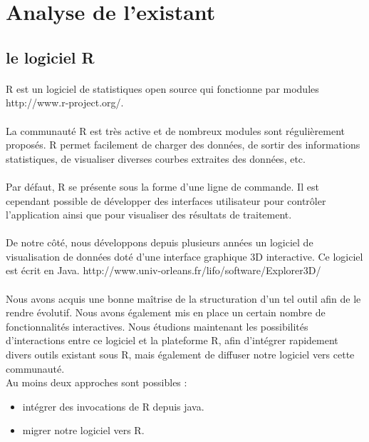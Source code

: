 \section{Analyse de l'existant}
\subsection{le logiciel R}
\paragraph{}
R est un logiciel de statistiques open source qui fonctionne par modules
http://www.r-project.org/.
\paragraph{}
La communauté R est très active et de nombreux modules sont régulièrement proposés.
R permet facilement de charger des données, de sortir des informations statistiques, de visualiser
diverses courbes extraites des données, etc.
\paragraph{}
Par défaut, R se présente sous la forme d'une ligne de commande. Il est cependant possible de
développer des interfaces utilisateur pour contrôler l'application ainsi que pour visualiser des
résultats de traitement.
\paragraph{}
De notre côté, nous développons depuis plusieurs années un logiciel de visualisation de données
doté d'une interface graphique 3D interactive. Ce logiciel est écrit en Java.
http://www.univ-orleans.fr/lifo/software/Explorer3D/
\paragraph{}
Nous avons acquis une bonne maîtrise de la structuration d'un tel outil afin de le rendre évolutif.
Nous avons également mis en place un certain nombre de fonctionnalités interactives.
Nous étudions maintenant les possibilités d'interactions entre ce logiciel et la plateforme R, afin d'intégrer rapidement divers outils existant sous R, mais également de diffuser notre logiciel vers cette communauté.\\Au moins deux approches sont possibles :
\begin{itemize}

\item intégrer des invocations de R depuis java.
\item migrer notre logiciel vers R.
\end{itemize}

